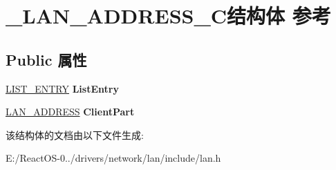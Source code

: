 \hypertarget{struct___l_a_n___a_d_d_r_e_s_s___c}{}\section{\+\_\+\+L\+A\+N\+\_\+\+A\+D\+D\+R\+E\+S\+S\+\_\+\+C结构体 参考}
\label{struct___l_a_n___a_d_d_r_e_s_s___c}
\subsection*{Public 属性}
\begin{DoxyCompactItemize}
\item 
\mbox{\label{struct___l_a_n___a_d_d_r_e_s_s___c_a33f6547b101d77c0f5baec344e1ab427}} 
\hyperlink{struct___l_i_s_t___e_n_t_r_y}{L\+I\+S\+T\+\_\+\+E\+N\+T\+RY} {\bfseries List\+Entry}
\item 
\mbox{\label{struct___l_a_n___a_d_d_r_e_s_s___c_ae8f070d1839fb7682503dabd9092d8ff}} 
\hyperlink{struct___l_a_n___a_d_d_r_e_s_s}{L\+A\+N\+\_\+\+A\+D\+D\+R\+E\+SS} {\bfseries Client\+Part}
\end{DoxyCompactItemize}


该结构体的文档由以下文件生成\+:\begin{DoxyCompactItemize}
\item 
E\+:/\+React\+O\+S-\/0../drivers/network/lan/include/lan.\+h\end{DoxyCompactItemize}
